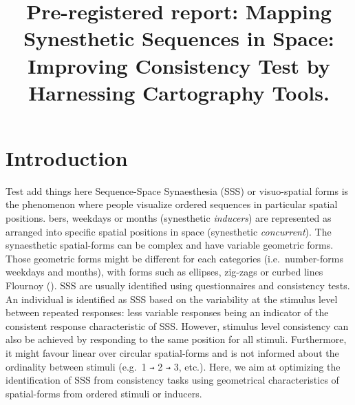 \documentclass[
  man,
  longtable,
  a4paper,
  nolmodern,
  notxfonts,
  notimes,
  colorlinks=true,linkcolor=blue,citecolor=blue,urlcolor=blue]{apa7}
\title{Pre-registered report: Mapping Synesthetic Sequences in Space:
Improving Consistency Test by Harnessing Cartography Tools.}
\affiliation{
{Psychology, UniDistance Suisse}}
\begin{document}
\maketitle



\setcounter{secnumdepth}{3}

\setlength\LTleft{0pt}

\resetlinenumber[1]



\section{Introduction}\label{sec-introduction}
Test add things here
Sequence-Space Synaesthesia (SSS) or visuo-spatial forms is the
phenomenon where people visualize ordered sequences in particular
spatial positions. bers, weekdays or months (synesthetic
\emph{inducers}) are represented as arranged into specific spatial
positions in space (synesthetic \emph{concurrent}). The synaesthetic
spatial-forms can be complex and have variable geometric forms. Those
geometric forms might be different for each categories
(i.e.~number-forms weekdays and months), with forms such as ellipses,
zig-zags or curbed lines Flournoy ().
SSS are usually identified using questionnaires and consistency tests.
An individual is identified as SSS based on the variability at the
stimulus level between repeated responses: less variable responses being
an indicator of the consistent response characteristic of SSS. However,
stimulus level consistency can also be achieved by responding to the
same position for all stimuli. Furthermore, it might favour linear over
circular spatial-forms and is not informed about the ordinality between
stimuli (e.g.~1 \texttt{→} 2 \texttt{→} 3, etc.). Here, we aim at
optimizing the identification of SSS from consistency tasks using
geometrical characteristics of spatial-forms from ordered stimuli or
inducers.
\end{document}
